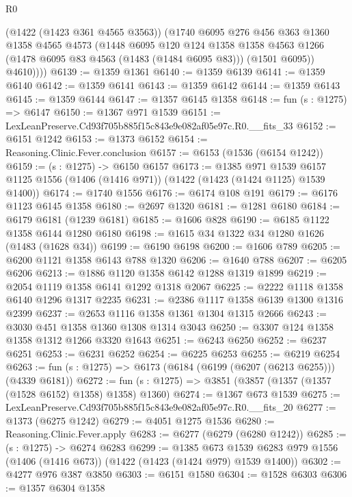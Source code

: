 \begin{lexlean}{R0}
\begin{coremodule}
          (@1422 (@1423 @361 @4565 @3563))
          (@1740
            @6095
            @276
            @456
            @363
            @1360
            @1358
            @4565
            @4573
            (@1448
              @6095
              @120
              @124
              @1358
              @1358
              @4563
              @1266
              (@1478 @6095 @83 @4563 (@1483 (@1484 @6095 @83)))
              (@1501 @6095))
            @4610))))
@6139 := @1359 @1361
@6140 := @1359 @6139
@6141 := @1359 @6140
@6142 := @1359 @6141
@6143 := @1359 @6142
@6144 := @1359 @6143
@6145 := @1359 @6144
@6147 := @1357 @6145 @1358
@6148 := fun (s : @1275) => @6147
@6150 := @1367 @971 @1539
@6151 := LexLeanPreserve.Cd93f705b885f15c843e9e082af05e97c.R0.__fits_33
@6152 := @6151 @1242
@6153 := @1373 @6152
@6154 := Reasoning.Clinic.Fever.conclusion
@6157 := @6153 (@1536 (@6154 @1242))
@6159 := (s : @1275) -> @6150 @6157
@6173 := @1385
    @971
    @1539
    @6157
    @1125
    @1556
    (@1406 (@1416 @971))
    (@1422 (@1423 (@1424 @1125) @1539 @1400))
@6174 := @1740 @1556
@6176 := @6174 @108 @191
@6179 := @6176 @1123 @6145 @1358
@6180 := @2697 @1320
@6181 := @1281 @6180
@6184 := @6179 @6181 (@1239 @6181)
@6185 := @1606 @828
@6190 := @6185 @1122 @1358 @6144 @1280 @6180
@6198 := @1615 @34 @1322 @34 @1280 @1626 (@1483 (@1628 @34))
@6199 := @6190 @6198
@6200 := @1606 @789
@6205 := @6200 @1121 @1358 @6143 @788 @1320
@6206 := @1640 @788
@6207 := @6205 @6206
@6213 := @1886 @1120 @1358 @6142 @1288 @1319 @1899
@6219 := @2054 @1119 @1358 @6141 @1292 @1318 @2067
@6225 := @2222 @1118 @1358 @6140 @1296 @1317 @2235
@6231 := @2386 @1117 @1358 @6139 @1300 @1316 @2399
@6237 := @2653 @1116 @1358 @1361 @1304 @1315 @2666
@6243 := @3030 @451 @1358 @1360 @1308 @1314 @3043
@6250 := @3307 @124 @1358 @1358 @1312 @1266 @3320 @1643
@6251 := @6243 @6250
@6252 := @6237 @6251
@6253 := @6231 @6252
@6254 := @6225 @6253
@6255 := @6219 @6254
@6263 := fun (s : @1275) => @6173 (@6184 (@6199 (@6207 (@6213 @6255))) (@4339 @6181))
@6272 := fun (s : @1275) => @3851 (@3857 (@1357 (@1357 (@1528 @6152) @1358) @1358) @1360)
@6274 := @1367 @673 @1539
@6275 := LexLeanPreserve.Cd93f705b885f15c843e9e082af05e97c.R0.__fits_20
@6277 := @1373 (@6275 @1242)
@6279 := @4051 @1275 @1536
@6280 := Reasoning.Clinic.Fever.apply
@6283 := @6277 (@6279 (@6280 @1242))
@6285 := (s : @1275) -> @6274 @6283
@6299 := @1385
    @673
    @1539
    @6283
    @979
    @1556
    (@1406 (@1416 @673))
    (@1422 (@1423 (@1424 @979) @1539 @1400))
@6302 := @4277 @976 @387 @3850
@6303 := @6151 @1580
@6304 := @1528 @6303
@6306 := @1357 @6304 @1358

\end{coremodule}
\end{lexlean}

